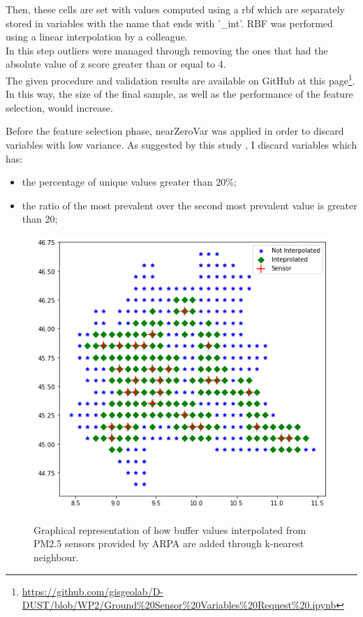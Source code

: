 Then, these cells are set with values computed using a \gls{rbf}  \cite{wright2003radial} which are separately stored in variables with the name that ends with '\_int'. RBF was performed using a linear interpolation by a colleague.\\
In this step outliers were managed through removing the ones that had the absolute value of z score greater than or equal to 4.\\
The given procedure and validation results are available on GitHub at this page\footnote{\url{https://github.com/gisgeolab/D-DUST/blob/WP2/Ground\%20Sensor\%20Variables\%20Request\%20.ipynb}}.
In this way, the size of the final sample, as well as the performance of the feature selection, would increase.
\par
Before the feature selection phase, nearZeroVar was applied in order to discard variables with low variance.
As suggested by this study \cite{kuhn2008building} , I discard variables which has: 
\begin{itemize}
    \item the percentage of unique values greater than 20\%;
    \item the ratio of the most prevalent over the second most prevalent value is greater than 20;
\end{itemize} 

\begin{figure}[H] \centering
{\includegraphics[scale=0.45]{images/buffer.png}}
 { \caption{Graphical representation of how buffer values interpolated from PM2.5 sensors provided by ARPA are added through k-nearest neighbour.}}
\end{figure}
\pagebreak
